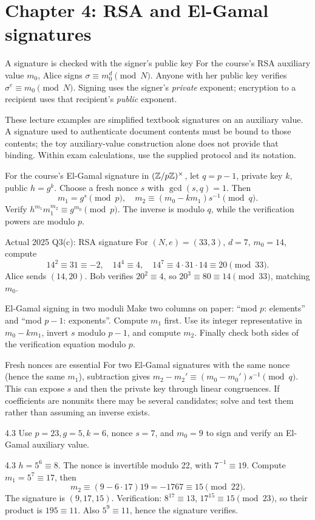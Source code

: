 \documentclass[11pt,a4paper]{article}
\begin{document}
\section{Chapter 4: RSA and El-Gamal signatures}
\begin{concept}{A signature is checked with the signer's public key}
For the course's RSA auxiliary value \(m_0\), Alice signs \(\sigma\equiv m_0^d\pmod N\). Anyone with her public key verifies \(\sigma^e\equiv m_0\pmod N\). Signing uses the signer's \emph{private} exponent; encryption to a recipient uses that recipient's \emph{public} exponent.

These lecture examples are simplified textbook signatures on an auxiliary value. A signature used to authenticate document contents must be bound to those contents; the toy auxiliary-value construction alone does not provide that binding. Within exam calculations, use the supplied protocol and its notation.

For the course's El-Gamal signature in \((\mathbb Z/p\mathbb Z)^\times\), let \(q=p-1\), private key \(k\), public \(h=g^k\). Choose a fresh nonce \(s\) with \(\gcd(s,q)=1\). Then
\[m_1=g^s\pmod p,\quad m_2\equiv(m_0-km_1)s^{-1}\pmod q.\]
Verify \(h^{m_1}m_1^{m_2}\equiv g^{m_0}\pmod p\). The inverse is modulo \(q\), while the verification powers are modulo \(p\).
\end{concept}
\begin{example}{Actual 2025 Q3(c): RSA signature}
For \((N,e)=(33,3)\), \(d=7\), \(m_0=14\), compute
\[14^2\equiv31\equiv-2,\quad14^4\equiv4,\quad14^7\equiv4\cdot31\cdot14\equiv20\pmod{33}.\]
Alice sends \((14,20)\). Bob verifies \(20^2\equiv4\), so \(20^3\equiv80\equiv14\pmod{33}\), matching \(m_0\).
\end{example}
\begin{method}{El-Gamal signing in two moduli}
Make two columns on paper: ``mod \(p\): elements'' and ``mod \(p-1\): exponents''. Compute \(m_1\) first. Use its integer representative in \(m_0-km_1\), invert \(s\) modulo \(p-1\), and compute \(m_2\). Finally check both sides of the verification equation modulo \(p\).
\end{method}
\begin{tip}{Fresh nonces are essential}
For two El-Gamal signatures with the same nonce (hence the same \(m_1\)), subtraction gives \(m_2-m_2'\equiv(m_0-m_0')s^{-1}\pmod q\). This can expose \(s\) and then the private key through linear congruences. If coefficients are nonunits there may be several candidates; solve and test them rather than assuming an inverse exists.
\end{tip}
\begin{question}{4.3}
Use \(p=23,g=5,k=6\), nonce \(s=7\), and \(m_0=9\) to sign and verify an El-Gamal auxiliary value.
\end{question}
\begin{answer}{4.3}
\(h=5^6\equiv8\). The nonce is invertible modulo 22, with \(7^{-1}\equiv19\). Compute \(m_1=5^7\equiv17\), then
\[m_2\equiv(9-6\cdot17)19=-1767\equiv15\pmod{22}.\]
The signature is \((9,17,15)\). Verification: \(8^{17}\equiv13\), \(17^{15}\equiv15\pmod{23}\), so their product is \(195\equiv11\). Also \(5^9\equiv11\), hence the signature verifies.
\end{answer}
\end{document}

